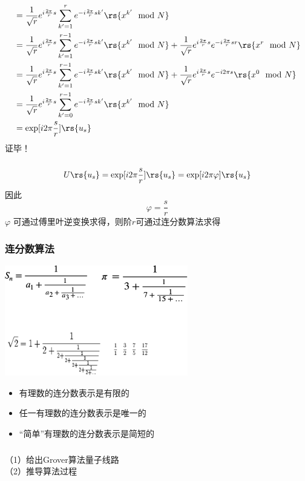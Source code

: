 \begin{frame}
    \frametitle{}        
    \[\begin{aligned}
    &= \frac{1}{\sqrt{r}} e^{i \frac{2\pi}{r}s }  \sum_{k'=1} ^{r}  e^{-i \frac{2\pi}{r} sk' } \rs{x^{k'} \mod N} \\
    &= \frac{1}{\sqrt{r}} e^{i \frac{2\pi}{r}s }  \sum_{k'=1} ^{r-1}  e^{-i \frac{2\pi}{r} sk' } \rs{x^{k'} \mod N} 
    + \frac{1}{\sqrt{r}} e^{i \frac{2\pi}{r}s }  e^{-i \frac{2\pi}{r} s r } \rs{x^{r} \mod N} \\
    &= \frac{1}{\sqrt{r}} e^{i \frac{2\pi}{r}s }  \sum_{k'=1} ^{r-1}  e^{-i \frac{2\pi}{r} sk' } \rs{x^{k'} \mod N} 
    + \frac{1}{\sqrt{r}} e^{i \frac{2\pi}{r}s }  e^{-i 2\pi s } \rs{x^{0} \mod N} \\
    &= \frac{1}{\sqrt{r}} e^{i \frac{2\pi}{r}s }  \sum_{k'=0} ^{r-1}  e^{-i \frac{2\pi}{r} sk' } \rs{x^{k'} \mod N} \\
    &=\exp[i2\pi\frac{s}{r}] \rs{u_s}
    \end{aligned}\]  
    证毕！ 
\end{frame}

\begin{frame}
    \frametitle{}  
    \[U\rs{u_s}=\exp[i2\pi\frac{s}{r}] \rs{u_s} = \exp[i2\pi\varphi] \rs{u_s}\]
    因此
    \[\varphi=\frac{s}{r}\]
    $\varphi$ 可通过傅里叶逆变换求得，则阶$r$可通过连分数算法求得
\end{frame}

\begin{frame}
    \frametitle{连分数算法}  
    \begin{center}
        \includegraphics[width=0.6\textwidth]{figs/39.png}
    \end{center}
    \begin{itemize}
        \item 有理数的连分数表示是有限的
        \item 任一有理数的连分数表示是唯一的
        \item “简单”有理数的连分数表示是简短的
        
    \end{itemize}  
\end{frame}

\begin{frame}
    \frametitle{}
    \begin{tcolorbox3}[专题、Grover量子搜索算法]
        （1）给出Grover算法量子线路 \\
        （2）推导算法过程\\
    \end{tcolorbox3}
\end{frame}